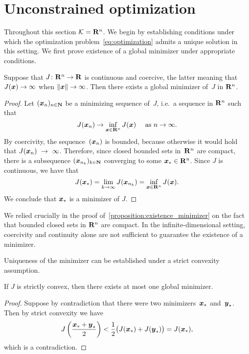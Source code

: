 \section{Unconstrained optimization}
\label{sec:unconstrained_optimization}
Throughout this section $\mathcal K = \mathbf R^n$.
We begin by establishing conditions under which the optimization problem~\eqref{eq:optimization} admits a unique solution in this setting.
We first prove existence of a global minimizer under appropriate conditions.
\begin{proposition}
    \label{proposition:existence_minimizer}
    Suppose that $J \colon \mathbf R^n \to \mathbf R$ is continuous and coercive,
    the latter meaning that $J(\mathbf{\boldsymbol{x}}) \to \infty$ when $\lVert\mathbf{\boldsymbol{x}}\rVert \to \infty$.
    Then there exists a global minimizer of~$J$ in $\mathbf R^n$.
\end{proposition}
\begin{proof}
    Let $(\mathbf{\boldsymbol{x}}_n)_{n \in \mathbf N}$ be a minimizing sequence of~$J$,
    i.e.\ a sequence in $\mathbf R^n$ such that
    \[
        J(\mathbf{\boldsymbol{x}}_n) \to \inf_{\mathbf{\boldsymbol{x}} \in \mathbf R^n} J(\mathbf{\boldsymbol{x}}) \quad \text{ as $n \to \infty$}.
    \]
    By coercivity, the sequence~$(\mathbf{\boldsymbol{x}}_n)$ is bounded,
    because otherwise it would hold that $J(\mathbf{\boldsymbol{x}}_n)~\to~\infty$.
    Therefore, since closed bounded sets in~$\mathbf R^n$ are compact,
    there is a subsequence $(\mathbf{\boldsymbol{x}}_{n_k})_{k \in \mathbf N}$ converging to some $\mathbf{\boldsymbol{x}}_* \in \mathbf R^n$.
    Since $J$ is continuous, we have that
    \[
        J(\mathbf{\boldsymbol{x}}_*) = \lim_{k \to \infty} J(\mathbf{\boldsymbol{x}}_{n_k}) = \inf_{\mathbf{\boldsymbol{x}} \in \mathbf R^n} J(\mathbf{\boldsymbol{x}}).
    \]
    We conclude that $\mathbf{\boldsymbol{x}}_*$ is a minimizer of $J$.
\end{proof}
\begin{remark}
    We relied crucially in the proof of~\cref{proposition:existence_minimizer} on the fact that bounded closed sets in $\mathbf R^n$ are compact.
    In the infinite-dimensional setting,
    coercivity and continuity alone are not sufficient to guarantee the existence of a minimizer.
\end{remark}

Uniqueness of the minimizer can be established under a strict convexity assumption.

\begin{proposition}
    \label{proposition:uniqueness_minimizer}
    If $J$ is strictly convex,
    then there exists at most one global minimizer.
\end{proposition}
\begin{proof}
    Suppose by contradiction that there were two minimizers~$\mathbf{\boldsymbol{x}}_*$ and~$\mathbf{\boldsymbol{y}}_*$.
    Then by strict convexity we have
    \[
        J \left( \frac{\mathbf{\boldsymbol{x}}_* + \mathbf{\boldsymbol{y}}_*}{2} \right)
        < \frac{1}{2} \bigl( J(\mathbf{\boldsymbol{x}}_*) + J(\mathbf{\boldsymbol{y}}_*) \bigr) = J(\mathbf{\boldsymbol{x}}_*),
    \]
    which is a contradiction.
\end{proof}

